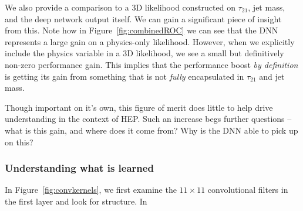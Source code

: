 \documentclass{article}
\begin{document}
We also provide a comparison to a 3D likelihood constructed on $\tau_{21}$, jet mass, and the deep network output itself. We can gain a significant piece of insight from this. Note how in Figure~\ref{fig:combinedROC} we can see that the DNN represents a large gain on a physics-only likelihood. However, when we explicitly include the physics variable in a 3D likelihood, we see a small but definitively non-zero performance gain. This implies that the performance boost \emph{by definition} is getting its gain from something that is not \emph{fully} encapsulated in $\tau_{21}$ and jet mass. 

Though important on it's own, this figure of merit does little to help drive understanding in the context of HEP. Such an increase begs further questions -- what is this gain, and where does it come from? Why is the DNN able to pick up on this?



\subsubsection{Understanding what is learned} %
\label{ssub:understanding_what_is_learned}

In Figure~\ref{fig:convkernels}, we first examine the $11\times11$ convolutional filters in the first layer and look for structure. In
\end{document}

